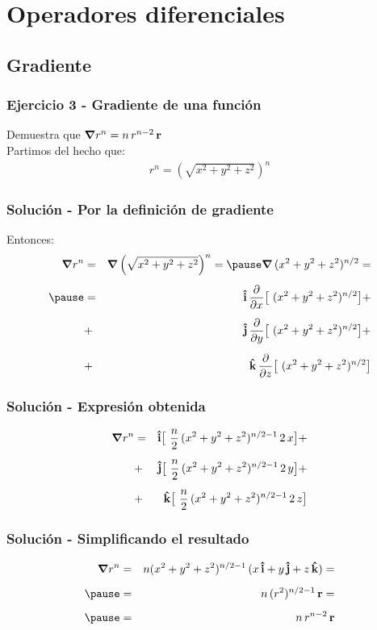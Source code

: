 \documentclass[12pt]{beamer}
\begin{document}
\section{Operadores diferenciales}
\subsection{Gradiente}

\begin{frame}
\frametitle{Ejercicio 3 - Gradiente de una función}
Demuestra que $\grad{r^{n}} = n \, r^{n-2} \, \vb{r}$
\\
\bigskip
\pause
Partimos del hecho que:
\begin{align*}
r^{n} = \left( \sqrt{x^{2} + y^{2} + z^{2}} \right)^{n}
\end{align*}
\end{frame}
\begin{frame}
\frametitle{Solución - Por la definición de gradiente}
Entonces:
\begin{eqnarray*}
\grad{r^{n}} &=& \grad{\left( \sqrt{x^{2} + y^{2} + z^{2}} \right)^{n}} = \pause \grad \, (x^{2} + y^{2} + z^{2})^{n/2} = \\[0.5em] \pause
&=& \vu{i} \, \pdv{x} \big[ (x^{2} + y^{2} + z^{2})^{n/2} \big] + \\[0.5em]
&+& \vu{j} \, \pdv{y} \big[ (x^{2} + y^{2} + z^{2})^{n/2} \big] + \\[0.5em]
&+& \vu{k} \, \pdv{z} \big[ (x^{2} + y^{2} + z^{2})^{n/2} \big]
\end{eqnarray*}
\end{frame}
\begin{frame}
\frametitle{Solución - Expresión obtenida}
\begin{eqnarray*}
\grad{r^{n}} &=& \vu{i} \big[ \dfrac{n}{2} \, (x^{2} + y^{2} + z^{2})^{n/2 - 1} \, 2 \, x \big] + \\[0.5em]
&+& \vu{j} \big[ \dfrac{n}{2} \, (x^{2} + y^{2} + z^{2})^{n/2 - 1} \, 2 \, y \big] + \\[0.5em]
&+& \vu{k} \big[ \dfrac{n}{2} \, (x^{2} + y^{2} + z^{2})^{n/2 - 1} \, 2 \, z \big]
\end{eqnarray*}
\end{frame}
\begin{frame}
\frametitle{Solución - Simplificando el resultado}
\begin{eqnarray*}
\grad{r^{n}} &=&  n (x^{2} + y^{2} + z^{2})^{n/2 - 1} \, (x \, \vu{i} + y \, \vu{j} + z \, \vu{k}) = \\[0.5em] \pause
&=&  n \, (r^{2})^{n/2-1} \, \vb{r} = \\[0.5em] \pause
&=& n \, r^{n-2} \, \vb{r}
\end{eqnarray*}
\end{frame}
\end{document}
